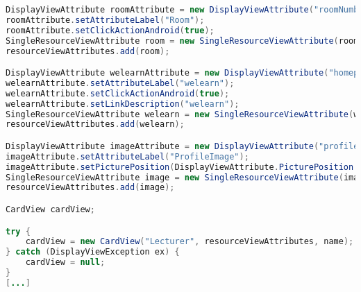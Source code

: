 \begin{lstlisting}[label=lst:cardview_impl,
language=java,
firstnumber=1,
caption=Erstellung einer \textit{CardView}.]
DisplayViewAttribute roomAttribute = new DisplayViewAttribute("roomNumber", ViewAttribute.AttributeType.HOME);
roomAttribute.setAttributeLabel("Room");
roomAttribute.setClickActionAndroid(true);
SingleResourceViewAttribute room = new SingleResourceViewAttribute(roomAttribute);
resourceViewAttributes.add(room);

DisplayViewAttribute welearnAttribute = new DisplayViewAttribute("homepage", ViewAttribute.AttributeType.URL);
welearnAttribute.setAttributeLabel("welearn");
welearnAttribute.setClickActionAndroid(true);
welearnAttribute.setLinkDescription("welearn");
SingleResourceViewAttribute welearn = new SingleResourceViewAttribute(welearnAttribute);
resourceViewAttributes.add(welearn);

DisplayViewAttribute imageAttribute = new DisplayViewAttribute("profileImageUrl", ViewAttribute.AttributeType.PICTURE);
imageAttribute.setAttributeLabel("ProfileImage");
imageAttribute.setPicturePosition(DisplayViewAttribute.PicturePosition.LEFT);
SingleResourceViewAttribute image = new SingleResourceViewAttribute(imageAttribute);
resourceViewAttributes.add(image);

CardView cardView;

try {
	cardView = new CardView("Lecturer", resourceViewAttributes, name);
} catch (DisplayViewException ex) {
	cardView = null;
}
[...]
\end{lstlisting}